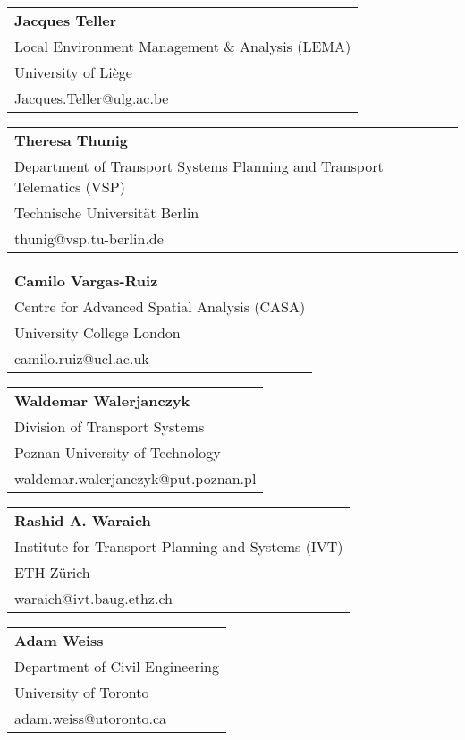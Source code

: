 \begin{tabular}[width=0.48\textwidth]{@{}l}
\textbf{Jacques Teller} \\
Local Environment Management \& Analysis (LEMA) \\
University of Liège \\
Jacques.Teller@ulg.ac.be \\
\end{tabular}

\begin{tabular}[width=0.48\textwidth]{@{}l}
\textbf{Theresa Thunig} \\
Department of Transport Systems Planning and Transport Telematics (VSP) \\
Technische Universität Berlin \\
thunig@vsp.tu-berlin.de \\
\end{tabular}

\begin{tabular}[width=0.48\textwidth]{@{}l}
\textbf{Camilo Vargas-Ruiz} \\
Centre for Advanced Spatial Analysis (CASA) \\
University College London \\
camilo.ruiz@ucl.ac.uk \\
\end{tabular}

\begin{tabular}[width=0.48\textwidth]{@{}l}
\textbf{Waldemar Walerjanczyk} \\
Division of Transport Systems \\
Poznan University of Technology \\
waldemar.walerjanczyk@put.poznan.pl \\
\end{tabular}

\begin{tabular}[width=0.48\textwidth]{@{}l}
\textbf{Rashid A. Waraich} \\
Institute for Transport Planning and Systems (IVT) \\
ETH Zürich \\
waraich@ivt.baug.ethz.ch \\
\end{tabular}

\begin{tabular}[width=0.48\textwidth]{@{}l}
\textbf{Adam Weiss} \\
Department of Civil Engineering \\
University of Toronto \\
adam.weiss@utoronto.ca  \\
\end{tabular}

